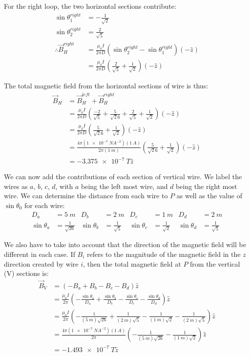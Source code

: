 \begin{solution}
For the right loop, the two horizontal sections contribute:
\begin{align*}
\sin\theta_1^{right}&=-\frac{1}{\sqrt 2}\\
\sin\theta_2^{right}&=\frac{2}{\sqrt 5}\\
\therefore\vec B_H^{right}&=\frac{\mu_0I}{2\pi D}(\sin\theta_2^{right}-\sin\theta_1^{right})(-\hat z)\\
&=\frac{\mu_0I}{2\pi D}\left(\frac{2}{\sqrt 5}+\frac{1}{\sqrt 2}\right)(-\hat z)
\end{align*}

The total magnetic field from the horizontal sections of wire is thus:
\begin{align*}
\vec B_H&=\vec B_H^{left}+\vec B_H^{right}\\
&=\frac{\mu_0I}{2\pi D}\left(  \frac{-2}{\sqrt 5}+\frac{5}{\sqrt 26}+\frac{2}{\sqrt 5}+\frac{1}{\sqrt 2}\right)(-\hat z)\\
&=\frac{\mu_0I}{2\pi D}\left(  \frac{5}{\sqrt 26}+\frac{1}{\sqrt 2}\right)(-\hat z)\\
&=\frac{4\pi(\SI{1e-7}{NA^{-2}})(\SI{1}{A})}{2\pi(\SI{1}{m})}\left(  \frac{5}{\sqrt 26}+\frac{1}{\sqrt 2}\right)(-\hat z)\\
&=\SI{-3.375e-7}{T}\hat z
\end{align*}

We can now add the contributions of each section of vertical wire. We label the wires as $a$, $b$, $c$, $d$, with $a$ being the left most wire, and $d$ being the right most wire. We can determine the distance from each wire to $P$ as well as the value of $\sin\theta_0$ for each wire:
\begin{align*}
D_a&=\SI{5}{m}& D_b&=\SI{2}{m}& D_c&=\SI{1}{m}& D_d&=\SI{2}{m}\\
\sin\theta_a&=\frac{1}{\sqrt{26}} &\sin\theta_b&=\frac{1}{\sqrt{5}} &\sin\theta_c&=\frac{1}{\sqrt{2}} &\sin\theta_d&=\frac{1}{\sqrt{5}}
\end{align*}

We also have to take into account that the direction of the magnetic field will be different in each case. If $B_i$ refers to the magnitude of the magnetic field in the $z$ direction created by wire $i$, then the total magnetic field at $P$ from the vertical (V) sections is:
\begin{align*}
\vec B_V&=(-B_a+B_b-B_c-B_d)\hat z\\
&=\frac{\mu_0I}{2\pi}\left( -\frac{\sin\theta_a}{D_a}+\frac{\sin\theta_b}{D_b}-\frac{\sin\theta_c}{D_c}-\frac{\sin\theta_d}{D_d}  \right)\hat z\\
&=\frac{\mu_0I}{2\pi}\left( -\frac{1}{(\SI{5}{m})\sqrt{26}}+ \frac{1}{(\SI{2}{m})\sqrt{5}} - \frac{1}{(\SI{1}{m})\sqrt{2}} - \frac{1}{(\SI{2}{m})\sqrt{5}}\right )\hat z\\
&=\frac{4\pi(\SI{1e-7}{NA^{-2}})(\SI{1}{A})}{2\pi}\left( -\frac{1}{(\SI{5}{m})\sqrt{26}} - \frac{1}{(\SI{1}{m})\sqrt{2}}\right )\hat z\\
&=\SI{-1.493e-7}{T}\hat z
\end{align*}


\end{solution}
